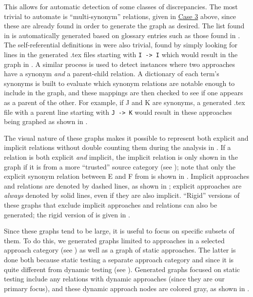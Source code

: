     This allows for automatic detection of some classes of discrepancies. The
    most trivial to automate is ``multi-synonym'' relations, given in
    \hyperref[case-three]{Case 3} above, since these are already found in order
    to generate the graph as desired. The list found in 
    is automatically generated based on glossary entries such as those found
    in . The self-referential definitions in
     were also trivial, found by simply looking for lines in
    the generated .tex files starting with \texttt{I -> I} which would
    result in the graph in . A similar process
    is used to detect instances where two approaches have a synonym
    \emph{and} a parent-child relation. A dictionary of each term's
    synonyms is built to evaluate which synonym relations are notable
    enough to include in the graph, and these mappings are then checked to
    see if one appears as a parent of the other. For example, if J and K
    are synonyms, a generated .tex file with a parent line starting with
    \texttt{J -> K} would result in these approaches being graphed as shown
    in .

    The visual nature of these graphs makes it possible to represent both
    explicit and implicit relations without double counting them during the
    analysis in . If a relation is both explicit
    \emph{and} implicit, the implicit relation is only shown in the graph
    if it is from a more ``trusted'' source category (see );
    note that only the explicit synonym relation between E and F
    from  is shown in .
    Implicit approaches and relations are denoted by dashed lines, as shown
    in ; explicit approaches are
    \emph{always} denoted by solid lines, even if they are also implicit.
    ``Rigid'' versions of these graphs that exclude implicit approaches and
    relations can also be generated; the rigid version of
     is given in .

\fi
Since these graphs tend to be large, it is useful to focus on specific
subsets of them. \ifnotpaper To do this, we generated graphs limited to
    approaches in a selected approach category (see )
    as well as a graph of static approaches. The latter is done both
    because \citet[Fig.~2]{IEEE2022}  static
    testing a separate approach category and since it is quite different
    from dynamic testing (see ). Generated graphs focused
    on static testing include any relations with dynamic approaches (since
    they are our primary focus), and these dynamic approach nodes are
    colored gray, as shown in .

